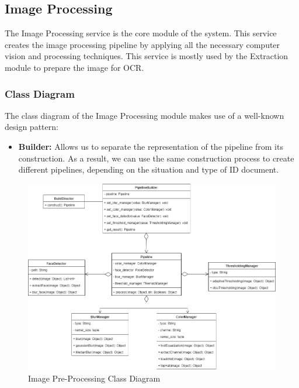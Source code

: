 \documentclass{article}
\begin{document}
\subsection{Image Processing}
The Image Processing service is the core module of the system. This service creates the image processing pipeline by applying all the necessary computer vision and processing techniques. This service is mostly used by the Extraction module to prepare the image for OCR. 
\subsubsection{Class Diagram}
The class diagram of the Image Processing module makes use of a well-known design pattern: 
\begin{itemize}
	\item \textbf{Builder:} Allows us to separate the representation of the pipeline from its construction. As a result, we can use the same construction process to create different pipelines, depending on the situation and type of ID document.
\end{itemize}
	\begin{figure}[H]
	    \centering
	    \includegraphics[scale=0.5]{img/imageProcessingClassDiagram.png}
	    \caption{Image Pre-Processing Class Diagram}
	 \end{figure}
	 \pagebreak
\end{document}
